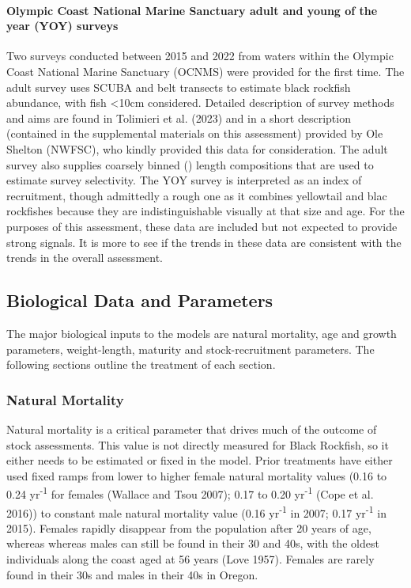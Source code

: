 \documentclass[11pt,
  english,
  letterpaper,
]{article}
\begin{document}
\hypertarget{olympic-coast-national-marine-sanctuary-adult-and-young-of-the-year-yoy-surveys}{%
\paragraph{Olympic Coast National Marine Sanctuary adult and young of the year (YOY) surveys}\label{olympic-coast-national-marine-sanctuary-adult-and-young-of-the-year-yoy-surveys}}

Two surveys conducted between 2015 and 2022 from waters within the Olympic Coast National Marine Sanctuary (OCNMS) were provided for the first time. The adult survey uses SCUBA and belt transects to estimate black rockfish abundance, with fish \textless10cm considered. Detailed description of survey methods and aims are found in Tolimieri et al. (2023) and in a short description (contained in the supplemental materials on this assessment) provided by Ole Shelton (NWFSC), who kindly provided this data for consideration. The adult survey also supplies coarsely binned () length compositions that are used to estimate survey selectivity. The YOY survey is interpreted as an index of recruitment, though admittedly a rough one as it combines yellowtail and blac rockfishes because they are indistinguishable visually at that size and age. For the purposes of this assessment, these data are included but not expected to provide strong signals. It is more to see if the trends in these data are consistent with the trends in the overall assessment.

\hypertarget{biological-data-and-parameters}{%
\subsection{Biological Data and Parameters}\label{biological-data-and-parameters}}

The major biological inputs to the models are natural mortality, age and growth parameters, weight-length, maturity and stock-recruitment parameters. The following sections outline the treatment of each section.

\hypertarget{natural-mortality}{%
\subsubsection{Natural Mortality}\label{natural-mortality}}

Natural mortality is a critical parameter that drives much of the outcome of stock assessments. This value is not directly measured for Black Rockfish, so it either needs to be estimated or fixed in the model. Prior treatments have either used fixed ramps from lower to higher female natural mortality values (0.16 to 0.24 yr\textsuperscript{-1} for females (Wallace and Tsou 2007); 0.17 to 0.20 yr\textsuperscript{-1} (Cope et al. 2016)) to constant male natural mortality value (0.16 yr\textsuperscript{-1} in 2007; 0.17 yr\textsuperscript{-1} in 2015). Females rapidly disappear from the population after 20 years of age, whereas whereas males can still be found in their 30 and 40s, with the oldest individuals along the coast aged at 56 years (Love 1957). Females are rarely found in their 30s and males in their 40s in Oregon.
\end{document}
